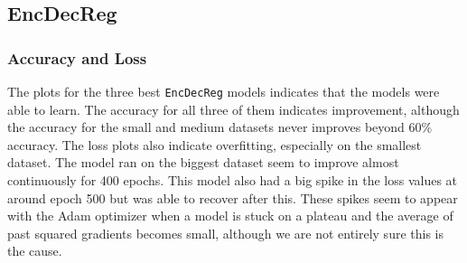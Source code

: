 \newpage
\subsection{EncDecReg}
\subsubsection{Accuracy and Loss}
\newpage
{}

The plots for the three best {\tt EncDecReg} models indicates that the models were able to learn. The accuracy for all three of them indicates improvement, although the accuracy for the small and medium datasets never improves beyond 60\% accuracy. The loss plots also indicate overfitting, especially on the smallest dataset. The model ran on the biggest dataset seem to improve almost continuously for 400 epochs. This model also had a big spike in the loss values at around epoch 500 but was able to recover after this. These spikes seem to appear with the Adam optimizer when a model is stuck on a plateau and the average of past squared gradients becomes small, although we are not entirely sure this is the cause.

\newpage
